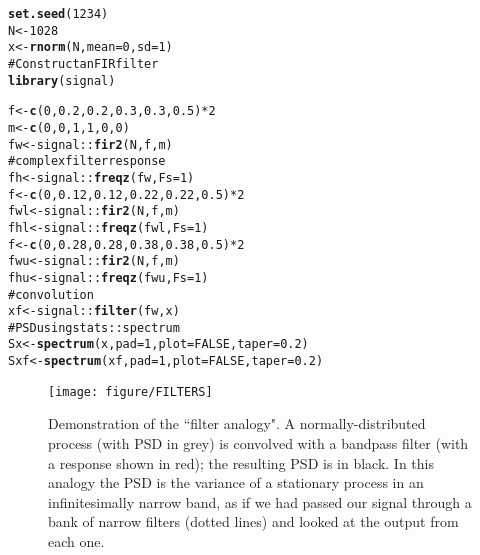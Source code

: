 \documentclass[11pt]{article}\usepackage{graphicx, color}
\makeatletter
\def\maxwidth{ %
  \ifdim\Gin@nat@width>\linewidth
    \linewidth
  \else
    \Gin@nat@width
  \fi
}
\newcommand{\hlfunctioncall}[1]{\textcolor[rgb]{0.501960784313725,0,0.329411764705882}{\textbf{#1}}}%
\newcommand{\hlcomment}[1]{\textcolor[rgb]{0.180392156862745,0.6,0.341176470588235}{#1}}%
\newenvironment{kframe}{%
 \def\at@end@of@kframe{}%
 \ifinner\ifhmode%
  \def\at@end@of@kframe{\end{minipage}}%
  \begin{minipage}{\columnwidth}%
 \fi\fi%
 \def\FrameCommand##1{\hskip\@totalleftmargin \hskip-\fboxsep
 \colorbox{shadecolor}{##1}\hskip-\fboxsep
     \hskip-\linewidth \hskip-\@totalleftmargin \hskip\columnwidth}%
 \MakeFramed {\advance\hsize-\width
   \@totalleftmargin\z@ \linewidth\hsize
   \@setminipage}}%
 {\par\unskip\endMakeFramed%
 \at@end@of@kframe}
\newenvironment{knitrout}{}{} %
\makeatother
\begin{document}
\begin{knitrout}
\color{fgcolor}\begin{kframe}
\begin{alltt}
\hlfunctioncall{set.seed}(1234)
N <- 1028
x <- \hlfunctioncall{rnorm}(N, mean = 0, sd = 1)
\hlcomment{# Construct an FIR filter}
\hlfunctioncall{library}(signal)
\end{alltt}


{\ttfamily\noindent\itshape\color{messagecolor}{\#\# Loading required package: MASS}}

{\ttfamily\noindent\itshape\color{messagecolor}{\#\# \\\#\# Attaching package: 'signal'}}

{\ttfamily\noindent\itshape\color{messagecolor}{\#\# The following object(s) are masked from 'package:stats':\\\#\# \\\#\#\ \ \ \  filter, poly}}\begin{alltt}
f <- \hlfunctioncall{c}(0, 0.2, 0.2, 0.3, 0.3, 0.5) * 2
m <- \hlfunctioncall{c}(0, 0, 1, 1, 0, 0)
fw <- signal::\hlfunctioncall{fir2}(N, f, m)
\hlcomment{# complex filter response}
fh <- signal::\hlfunctioncall{freqz}(fw, Fs = 1)
f <- \hlfunctioncall{c}(0, 0.12, 0.12, 0.22, 0.22, 0.5) * 2
fwl <- signal::\hlfunctioncall{fir2}(N, f, m)
fhl <- signal::\hlfunctioncall{freqz}(fwl, Fs = 1)
f <- \hlfunctioncall{c}(0, 0.28, 0.28, 0.38, 0.38, 0.5) * 2
fwu <- signal::\hlfunctioncall{fir2}(N, f, m)
fhu <- signal::\hlfunctioncall{freqz}(fwu, Fs = 1)
\hlcomment{# convolution}
xf <- signal::\hlfunctioncall{filter}(fw, x)
\hlcomment{# PSD using stats::spectrum}
Sx <- \hlfunctioncall{spectrum}(x, pad = 1, plot = FALSE, taper = 0.2)
Sxf <- \hlfunctioncall{spectrum}(xf, pad = 1, plot = FALSE, taper = 0.2)
\end{alltt}
\end{kframe}
\end{knitrout}

%
\begin{figure}[htb!]
\begin{center}
\begin{knitrout}
\color{fgcolor}
\texttt{[image: figure/FILTERS]} 

\end{knitrout}

\caption{Demonstration of the ``filter analogy". 
A normally-distributed
process (with PSD in grey) is convolved with a bandpass
filter (with a response shown in red); the resulting PSD is in black.
In this analogy the PSD is the variance of a stationary 
process in an infinitesimally narrow band, as if we had 
passed our signal through a bank of narrow filters (dotted lines)
and looked at the output from each one.
}
\label{fig:filter}
\end{center}
\end{figure}
\end{document}
